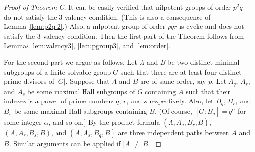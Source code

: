 \documentclass[a4paper,12pt]{article}
\theoremstyle{definition}
\theoremstyle{remark}
\theoremstyle{theorem}
\begin{document}
\begin{proof}[Proof of Theorem C]
  It can be easily verified that nilpotent groups of order $p^2q$ do
  not satisfy the $3$-valency condition. (This is also a consequence
  of Lemma~\ref{lem:p2q-2}.) Also, a nilpotent group of order $pqr$ is
  cyclic and does not satisfy the $3$-valency condition. Then the first part of the Theorem follows from Lemmas \ref{lem:valency3}, \ref{lem:pgroup3}, and
  \ref{lem:order}. 

For the second part we argue as follows. Let $A$ and $B$ be two distinct minimal subgroups of a finite solvable group $G$ such that there are at least four distinct prime divisors of $|G|$. Suppose that $A$ and $B$ are of same order, say $p$. Let $A_q$, $A_r$, and $A_s$ be some maximal Hall subgroups of $G$ containing $A$ such that their indexes is a power of prime numbers $q$, $r$, and $s$ respectively. Also, let $B_q$, $B_r$, and $B_s$ be some maximal Hall subgroups containing $B$. (Of course, $[G:B_q]=q^{\alpha}$ for some integer $\alpha$, and so on.) By the product formula $(A,A_q,B_r,B)$, $(A,A_r,B_s,B)$, and $(A,A_s,B_q,B)$ are three independent paths between $A$ and $B$. Similar arguments can be applied if $|A|\neq|B|$.
\end{proof}
\end{document}
